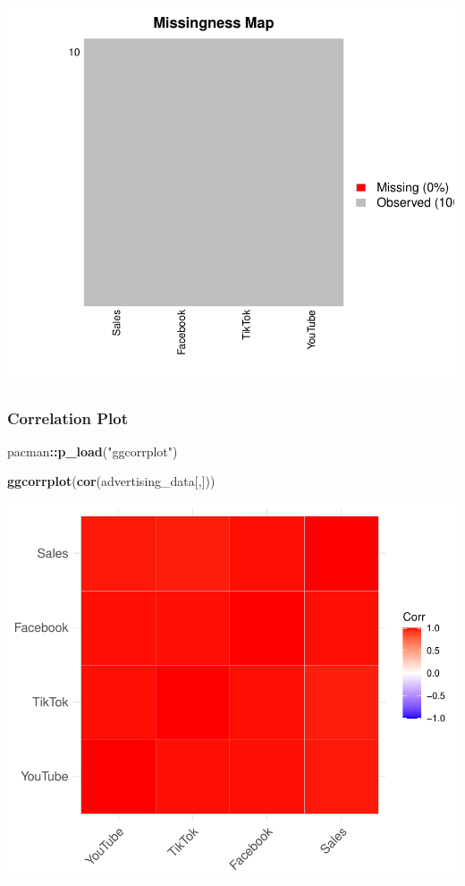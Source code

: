 \documentclass[
]{article}
\newenvironment{Shaded}{\begin{snugshade}}{\end{snugshade}}
\newcommand{\FunctionTok}[1]{\textcolor[rgb]{0.13,0.29,0.53}{\textbf{#1}}}
\newcommand{\NormalTok}[1]{#1}
\newcommand{\SpecialCharTok}[1]{\textcolor[rgb]{0.81,0.36,0.00}{\textbf{#1}}}
\newcommand{\StringTok}[1]{\textcolor[rgb]{0.31,0.60,0.02}{#1}}
\begin{document}
\includegraphics{2_multiple_linear_regression_files/figure-latex/missing_data_plot-1.pdf}

\subsubsection{\texorpdfstring{\textbf{Correlation
Plot}}{Correlation Plot}}\label{correlation-plot}

\begin{Shaded}
\begin{Highlighting}[]
\NormalTok{pacman}\SpecialCharTok{::}\FunctionTok{p\_load}\NormalTok{(}\StringTok{"ggcorrplot"}\NormalTok{)}

\FunctionTok{ggcorrplot}\NormalTok{(}\FunctionTok{cor}\NormalTok{(advertising\_data[,]))}
\end{Highlighting}
\end{Shaded}

\includegraphics{2_multiple_linear_regression_files/figure-latex/correlation_plot-1.pdf}
\end{document}
